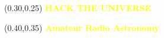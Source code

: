 \documentclass[aspectratio=169]{beamer} %
\begin{document}
\begin{frame}{}
    \setlength{\TPHorizModule}{\textwidth}
    \setlength{\TPVertModule}{\textwidth}
    \begin{textblock}{0.74}(0.30,0.25)
        \bfseries\huge\textcolor{yellow}{HACK THE UNIVERSE}
    \end{textblock}
    \begin{textblock}{0.74}(0.40,0.35)
    \bfseries\large\textcolor{yellow}{Amateur Radio Astronomy}
\end{textblock}
\end{frame}
\end{document}
